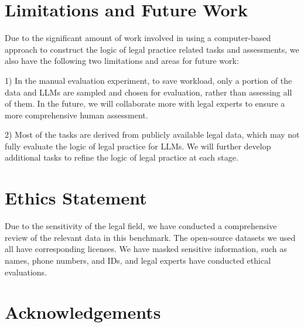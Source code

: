 \newpage
\section{Limitations and Future Work}
\label{sec:limitations}
Due to the significant amount of work involved in using a computer-based approach to construct the logic of legal practice related tasks and assessments, we also have the following two limitations and areas for future work:

1) In the manual evaluation experiment, to save workload, only a portion of the data and LLMs are sampled and chosen for evaluation, rather than assessing all of them. In the future, we will collaborate more with legal experts to ensure a more comprehensive human assessment.

2) Most of the tasks are derived from publicly available legal data, which may not fully evaluate the logic of legal practice for LLMs. We will further develop additional tasks to refine the logic of legal practice at each stage.

\section{Ethics Statement}
Due to the sensitivity of the legal field, we have conducted a comprehensive review of the relevant data in this benchmark. The open-source datasets we used all have corresponding licenses. We have masked sensitive information, such as names, phone numbers, and IDs, and legal experts have conducted ethical evaluations.

\section*{Acknowledgements}

